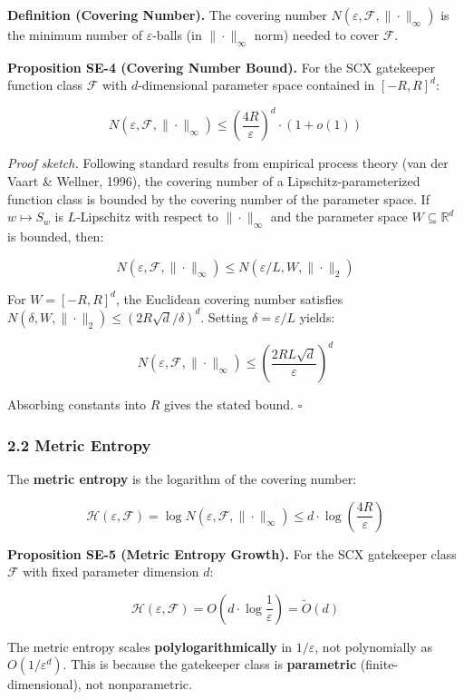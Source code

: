 \documentclass[
  12pt,
]{article}
\begin{document}
\textbf{Definition (Covering Number).} The covering number
\(N(\varepsilon, \mathcal{F}, \|\cdot\|_{\infty})\) is the minimum
number of \(\varepsilon\)-balls (in \(\|\cdot\|_{\infty}\) norm) needed
to cover \(\mathcal{F}\).

\textbf{Proposition SE-4 (Covering Number Bound).} For the SCX
gatekeeper function class \(\mathcal{F}\) with \(d\)-dimensional
parameter space contained in \([-R, R]^d\):

\[N(\varepsilon, \mathcal{F}, \|\cdot\|_{\infty}) \leq \left( \frac{4R}{\varepsilon} \right)^d \cdot (1 + o(1))\]

\emph{Proof sketch.} Following standard results from empirical process
theory (van der Vaart \& Wellner, 1996), the covering number of a
Lipschitz-parameterized function class is bounded by the covering number
of the parameter space. If \(w \mapsto S_w\) is \(L\)-Lipschitz with
respect to \(\|\cdot\|_{\infty}\) and the parameter space
\(W \subseteq \mathbb{R}^d\) is bounded, then:

\[N(\varepsilon, \mathcal{F}, \|\cdot\|_{\infty}) \leq N(\varepsilon/L, W, \|\cdot\|_2)\]

For \(W = [-R, R]^d\), the Euclidean covering number satisfies
\(N(\delta, W, \|\cdot\|_2) \leq (2R\sqrt{d}/\delta)^d\). Setting
\(\delta = \varepsilon/L\) yields:

\[N(\varepsilon, \mathcal{F}, \|\cdot\|_{\infty}) \leq \left( \frac{2RL\sqrt{d}}{\varepsilon} \right)^d\]

Absorbing constants into \(R\) gives the stated bound. \(\square\)

\subsubsection{2.2 Metric Entropy}\label{metric-entropy}

The \textbf{metric entropy} is the logarithm of the covering number:

\[\mathcal{H}(\varepsilon, \mathcal{F}) = \log N(\varepsilon, \mathcal{F}, \|\cdot\|_{\infty}) \leq d \cdot \log\left( \frac{4R}{\varepsilon} \right)\]

\textbf{Proposition SE-5 (Metric Entropy Growth).} For the SCX
gatekeeper class \(\mathcal{F}\) with fixed parameter dimension \(d\):

\[\mathcal{H}(\varepsilon, \mathcal{F}) = O\left( d \cdot \log\frac{1}{\varepsilon} \right) = \tilde{O}(d)\]

The metric entropy scales \textbf{polylogarithmically} in
\(1/\varepsilon\), not polynomially as \(O(1/\varepsilon^d)\). This is
because the gatekeeper class is \textbf{parametric}
(finite-dimensional), not nonparametric.
\end{document}
